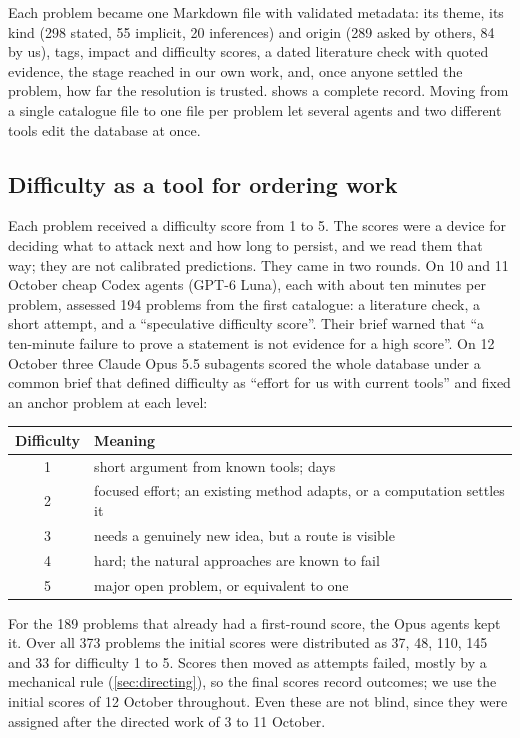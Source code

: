 \documentclass[11pt]{amsart}
\begin{document}
Each problem became one Markdown file with validated metadata: its theme, its
kind (298 stated, 55 implicit, 20 inferences) and origin (289 asked by others,
84 by us), tags, impact and difficulty scores, a dated literature check with
quoted evidence, the stage reached in our own work, and, once anyone settled
the problem, how far the resolution is trusted.  shows a
complete record. Moving from a single catalogue file to one file per problem
let several agents and two different tools edit the database at once.

\subsection*{Difficulty as a tool for ordering work}
Each problem received a difficulty score from 1 to 5. The scores were a device
for deciding what to attack next and how long to persist, and we read them that
way; they are not calibrated predictions. They came in two rounds. On 10 and 11
October cheap Codex agents (GPT-6 Luna), each with about ten minutes per
problem, assessed 194 problems from the first catalogue: a literature check, a
short attempt, and a ``speculative difficulty score''. Their brief warned that
``a ten-minute failure to prove a statement is not evidence for a high score''.
On 12 October three Claude Opus 5.5 subagents scored the whole database under a
common brief that defined difficulty as ``effort for us with current tools''
and fixed an anchor problem at each level:
\begin{center}
  \begin{tabular}{cl}
    \toprule
    Difficulty & Meaning                                                                \\
    \midrule
    1          & short argument from known tools; days                                  \\
    2          & focused effort; an existing method adapts, or a computation settles it \\
    3          & needs a genuinely new idea, but a route is visible                     \\
    4          & hard; the natural approaches are known to fail                         \\
    5          & major open problem, or equivalent to one                               \\
    \bottomrule
  \end{tabular}
\end{center}
For the 189 problems that already had a first-round score, the Opus agents kept
it. Over all 373 problems the initial scores were distributed as 37, 48, 110,
145 and 33 for difficulty 1 to 5. Scores then moved as attempts failed, mostly
by a mechanical rule (\cref{sec:directing}), so the final scores record
outcomes; we use the initial scores of 12 October throughout. Even these are
not blind, since they were assigned after the directed work of 3 to 11 October.
\end{document}
